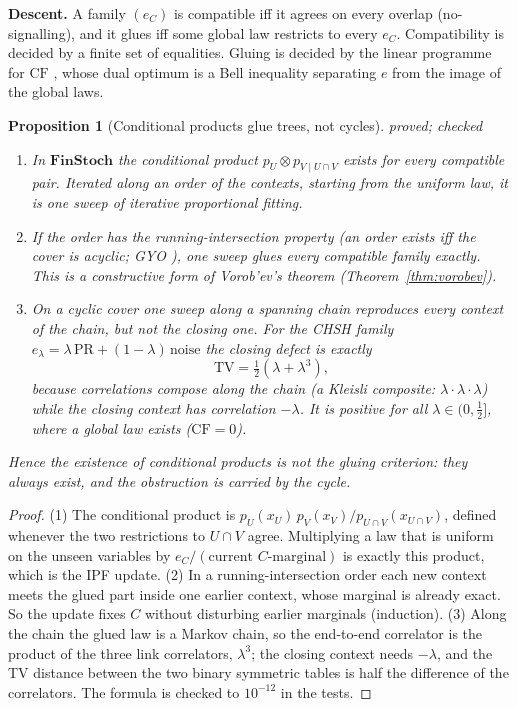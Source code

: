 \documentclass[11pt]{article}
\newtheorem{proposition}[theorem]{Proposition}
\theoremstyle{definition}
\theoremstyle{remark}
\newcommand{\CF}{\mathrm{CF}}
\newcommand{\st}[1]{\textsf{\small\color{gray}#1}}
\begin{document}
\textbf{Descent.} A family $(e_C)$ is compatible iff it agrees on every overlap (no-signalling), and it glues iff some global law restricts to every $e_C$. Compatibility is decided by a finite set of equalities. Gluing is decided by the linear programme for $\CF$ \cite{abm17}, whose dual optimum is a Bell inequality separating $e$ from the image of the global laws.

\begin{proposition}[Conditional products glue trees, not cycles]\label{prop:condprod}\st{proved; checked}
\leavevmode
\begin{enumerate}
  \item In $\mathbf{FinStoch}$ the conditional product $p_U\otimes p_{V\mid U\cap V}$ exists for \emph{every} compatible pair. Iterated along an order of the contexts, starting from the uniform law, it is one sweep of iterative proportional fitting.
  \item If the order has the running-intersection property (an order exists iff the cover is acyclic; GYO \cite{bfmy}), one sweep glues every compatible family exactly. This is a constructive form of Vorob'ev's theorem (Theorem~\ref{thm:vorobev}).
  \item On a cyclic cover one sweep along a spanning chain reproduces every context of the chain, but not the closing one. For the CHSH family $e_\lambda=\lambda\,\mathrm{PR}+(1-\lambda)\,\mathrm{noise}$ the closing defect is exactly
  \[ \mathrm{TV}=\tfrac12(\lambda+\lambda^3), \]
  because correlations compose along the chain (a Kleisli composite: $\lambda\cdot\lambda\cdot\lambda$) while the closing context has correlation $-\lambda$. It is positive for all $\lambda\in(0,\tfrac12]$, where a global law exists ($\CF=0$).
\end{enumerate}
Hence the existence of conditional products is not the gluing criterion: they always exist, and the obstruction is carried by the cycle.
\end{proposition}
\begin{proof}
(1) The conditional product is $p_U(x_U)\,p_V(x_V)/p_{U\cap V}(x_{U\cap V})$, defined whenever the two restrictions to $U\cap V$ agree. Multiplying a law that is uniform on the unseen variables by $e_C/(\text{current } C\text{-marginal})$ is exactly this product, which is the IPF update. (2) In a running-intersection order each new context meets the glued part inside one earlier context, whose marginal is already exact. So the update fixes $C$ without disturbing earlier marginals (induction). (3) Along the chain the glued law is a Markov chain, so the end-to-end correlator is the product of the three link correlators, $\lambda^3$; the closing context needs $-\lambda$, and the TV distance between the two binary symmetric tables is half the difference of the correlators. The formula is checked to $10^{-12}$ in the tests.
\end{proof}
\end{document}
